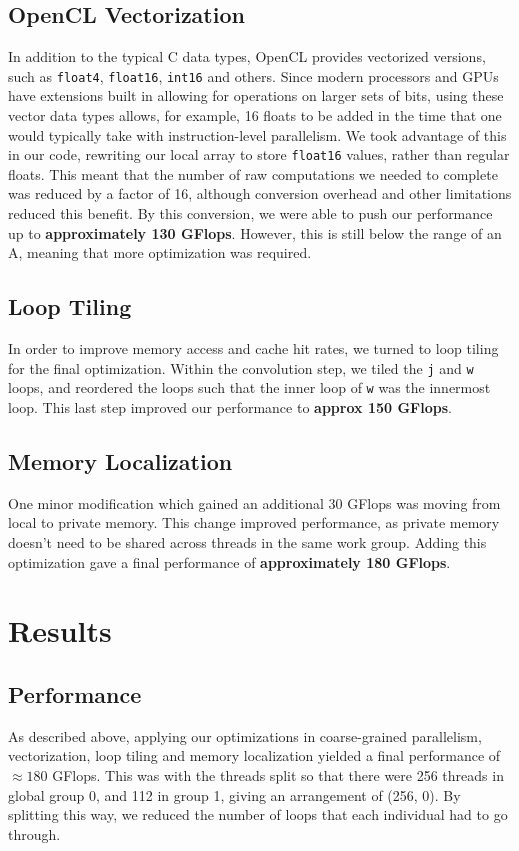 \documentclass[letterpaper,twocolumn,10pt]{article}
\def\code#1{\texttt{#1}}
\begin{document}
\subsection{OpenCL Vectorization}
In addition to the typical C data types, OpenCL provides vectorized versions,
such as \code{float4}, \code{float16}, \code{int16} and others. Since modern
processors and GPUs have extensions built in allowing for operations on larger
sets of bits, using these vector data types allows, for example, 16 floats to
be added in the time that one would typically take with instruction-level
parallelism. We took advantage of this in our code, rewriting our local array
to store \code{float16} values, rather than regular floats. This meant that
the number of raw computations we needed to complete was reduced by a factor
of 16, although conversion overhead and other limitations reduced this benefit.
By this conversion, we were able to push our performance up to 
\textbf{approximately 130 GFlops}. However, this is still below the range of
an A, meaning that more optimization was required.

\subsection{Loop Tiling}
In order to improve memory access and cache hit rates, we turned to loop
tiling for the final optimization. Within the convolution step, we tiled the
\code{j} and \code{w} loops, and reordered the loops such that the inner
loop of \code{w} was the innermost loop. This last step improved our
performance to \textbf{approx 150 GFlops}.

\subsection{Memory Localization}
One minor modification which gained an additional 30 GFlops was moving from
local to private memory. This change improved performance, as private memory
doesn't need to be shared across threads in the same work group. Adding this
optimization gave a final performance of \textbf{approximately 180 GFlops}.

\section{Results}
\subsection{Performance}
As described above, applying our optimizations in coarse-grained parallelism,
vectorization, loop tiling and memory localization yielded a final performance
of $\approx 180$ GFlops. This was with the threads split so that there were 256
threads in global group 0, and 112 in group 1, giving an arrangement of
(256, 0). By splitting this way, we reduced the number of loops that each
individual had to go through.
\end{document}
